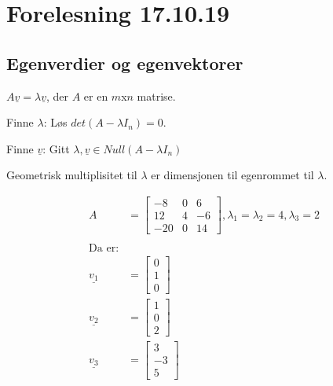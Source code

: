 \documentclass[11pt, a4paper, norsk]{article}
\begin{document}
        \section{Forelesning 17.10.19}

        \subsection{Egenverdier og egenvektorer}%
        \label{sub:egenverdier_og_egenvektorer}
        
        $A\underline{v} = \lambda \underline{v}$, der $A$ er en $m$x$n$ matrise. 

        Finne $\lambda$: Løs $det(A - \lambda I_{n}) = 0$.

        Finne $\underline{v}$: Gitt $\lambda, \underline{v} \in Null(A-\lambda I_{n})$ 

        Geometrisk multiplisitet til $\lambda$ er dimensjonen til egenrommet til $\lambda$. 

        \begin{Example}{}{}
            \begin{align*}
                A &= \begin{bmatrix}
                    -8 & 0 & 6 \\
                    12 & 4 & -6 \\
                    -20 & 0 & 14
                \end{bmatrix}, \lambda_{1} = \lambda_{2} = 4, \lambda_{3} = 2
                \\
                \\
                \text{Da er:}
                \\
                    \underline{v_1} &= \begin{bmatrix}
                    0 \\
                    1 \\
                    0
                \end{bmatrix}
                \\
                        \underline{v_2} &= \begin{bmatrix}
                    1 \\
                    0 \\
                    2
                \end{bmatrix}
                \\
                            \underline{v_3} &= \begin{bmatrix}
                    3 \\
                    -3 \\
                    5
                \end{bmatrix}
            \end{align*}
        \end{Example}
       
\end{document}
